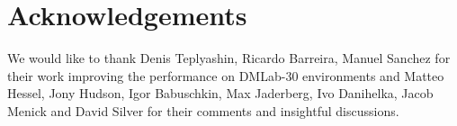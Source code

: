 \section*{Acknowledgements}

We would like to thank Denis Teplyashin, Ricardo Barreira, Manuel Sanchez for their work improving the performance on DMLab-30 environments and Matteo Hessel, Jony Hudson, Igor Babuschkin, Max Jaderberg, Ivo Danihelka, Jacob Menick and David Silver for their comments and insightful discussions.